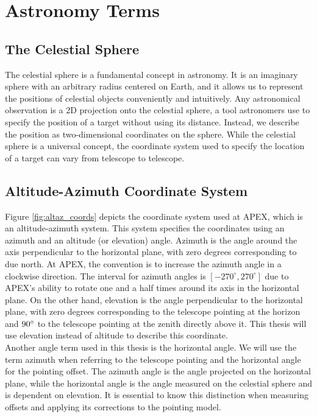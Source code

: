 \section{Astronomy Terms}\label{sec:ast_terms}
\subsection{The Celestial Sphere}
The celestial sphere is a fundamental concept in astronomy.
It is an imaginary sphere with an arbitrary radius centered on Earth, and it allows us to represent the positions of celestial objects conveniently and intuitively.
Any astronomical observation is a 2D projection onto the celestial sphere, a tool astronomers use to specify the position of a target without using its distance.
Instead, we describe the position as two-dimensional coordinates on the sphere.
While the celestial sphere is a universal concept, the coordinate system used to specify the location of a target can vary from telescope to telescope.




\subsection{Altitude-Azimuth Coordinate System}\label{sec:altaz_coords}
Figure \ref{fig:altaz_coords} depicts the coordinate system used at APEX, which is an altitude-azimuth system.
This system specifies the coordinates using an azimuth and an altitude (or elevation) angle.
Azimuth is the angle around the axis perpendicular to the horizontal plane, with zero degrees corresponding to due north.
At APEX, the convention is to increase the azimuth angle in a clockwise direction.
The interval for azimuth angles is $[-270^\circ,270^\circ]$ due to APEX's ability to rotate one and a half times around its axis in the horizontal plane.
On the other hand, elevation is the angle perpendicular to the horizontal plane, with zero degrees corresponding to the telescope pointing at the horizon and $90^\circ$ to the telescope pointing at the zenith directly above it.
This thesis will use elevation instead of altitude to describe this coordinate.\\

Another angle term used in this thesis is the horizontal angle.
We will use the term azimuth when referring to the telescope pointing and the horizontal angle for the pointing offset.
The azimuth angle is the angle projected on the horizontal plane, while the horizontal angle is the angle measured on the celestial sphere and is dependent on elevation.
It is essential to know this distinction when measuring offsets and applying its corrections to the pointing model.

